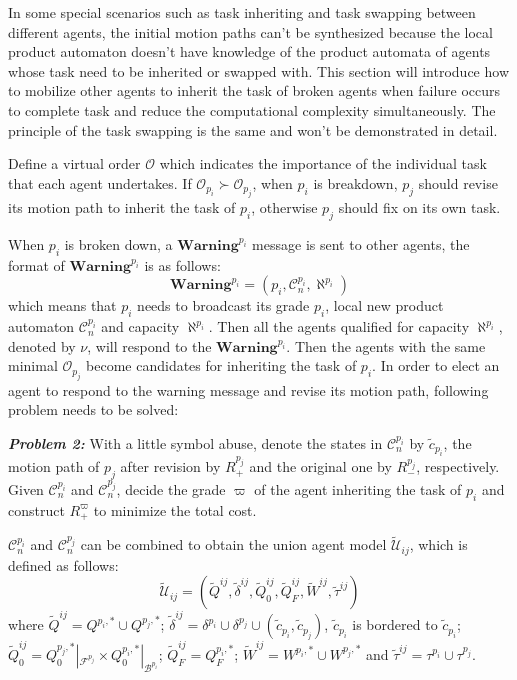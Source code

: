 \documentclass[journal]{IEEEtran}
\begin{document}
In some special scenarios such as task inheriting and task swapping between different agents, the initial motion paths can't be synthesized because the local product automaton doesn't have knowledge of the product automata of agents whose task need to be inherited or swapped with. This section will introduce how to mobilize other agents to inherit the task of broken agents when failure occurs to complete task and reduce the computational complexity simultaneously. The principle of the task swapping is the same and won't be demonstrated in detail.

Define a virtual order $\mathcal{O}$ which indicates the importance of the individual task that each agent undertakes. If $\mathcal{O}_{p_i}\succ \mathcal{O}_{p_j}$, when $p_i$ is breakdown, $p_j$ should revise its motion path to inherit the task of $p_i$, otherwise $p_j$ should fix on its own task.\par
When $p_i$ is broken down, a $\textbf{Warning}^{p_i}$ message is sent to other agents, the format of $\textbf{Warning}^{p_i}$ is as follows:
$$\textbf{Warning}^{p_i} = (p_i,\mathcal{C}^{p_i}_n,\aleph^{p_i})$$
which means that $p_i$ needs to broadcast its grade $p_i$, local new product automaton $\mathcal{C}^{p_i}_n$ and capacity $\aleph^{p_i}$. Then all the agents qualified for capacity $\aleph^{p_i}$, denoted by $\nu$, will respond to the $\textbf{Warning}^{p_i}$. Then the agents with the same minimal $\mathcal{O}_{p_j}$ become candidates for inheriting the task of $p_i$. In order to elect an agent to respond to the warning message and revise its motion path, following problem needs to be solved:\par
\textbf{\emph{Problem 2:}} With a little symbol abuse, denote the states in $\mathcal{C}^{p_i}_n$ by $\tilde{c}_{p_i}$, the motion path of $p_j$ after revision by $R^{p_j}_+$ and the original one by $R^{p_j}_-$, respectively. Given $\mathcal{C}^{p_i}_n$ and $\mathcal{C}^{p_j}_n$, decide the grade $\varpi$ of the agent inheriting the task of $p_i$ and construct $R^{\varpi}_+$ to minimize the total cost. \par
$\mathcal{C}^{p_i}_n$ and $\mathcal{C}^{p_j}_n$ can be combined to obtain the union agent model $\widetilde{\mathcal{U}}_{ij}$, which is defined as follows:
$$\widetilde{\mathcal{U}}_{ij}=(\widetilde{Q}^{ij},\tilde{\delta}^{ij},\widetilde{Q}^{ij}_0,\widetilde{Q}^{ij}_F,\widetilde{W}^{ij},\tilde{\tau}^{ij})$$
where $\widetilde{Q}^{ij}=Q^{p_i,\ast}\cup Q^{p_j,\ast}$; $\tilde{\delta}^{ij}=\delta^{p_i}\cup \delta^{p_j} \cup (\tilde{c}_{p_i},\tilde{c}_{p_j})$, $\tilde{c}_{p_i}$ is bordered to $\tilde{c}_{p_i}$; $\widetilde{Q}^{ij}_0=Q^{p_j,\ast}_0|_{\mathcal{F}^{p_j}}\times Q^{p_i,\ast}_0|_{\mathcal{B}^{p_i}} $; $\widetilde{Q}^{ij}_F=Q^{p_i,\ast}_F$; $\widetilde{W}^{ij}=W^{p_i,\ast}\cup W^{p_j,\ast}$ and $\tilde{\tau}^{ij}=\tau^{p_i}\cup \tau^{p_j}$.\par
\end{document}
